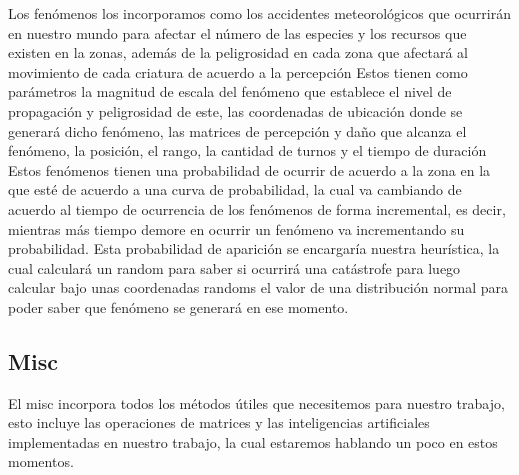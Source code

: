 \documentclass{llncs}
\begin{document}
Los fenómenos los incorporamos como los accidentes meteorológicos que ocurrirán en nuestro mundo para afectar el número de las especies y los recursos que existen en la zonas, además de la peligrosidad en cada zona que afectará al movimiento de cada criatura de acuerdo a la percepción
\newline
\newline
Estos tienen como parámetros la magnitud de escala del fenómeno que establece el nivel de propagación y peligrosidad de este, las coordenadas de ubicación donde se generará dicho fenómeno, las matrices de percepción y daño que alcanza el fenómeno, la posición, el rango, la cantidad de turnos y el tiempo de duración
\newline
\newline
Estos fenómenos tienen una probabilidad de ocurrir de acuerdo a la zona en la que esté de acuerdo a una curva de probabilidad, la cual va cambiando de acuerdo al tiempo de ocurrencia de los fenómenos de forma incremental, es decir, mientras más tiempo demore en ocurrir un fenómeno va incrementando su probabilidad. Esta probabilidad de aparición se encargaría nuestra heurística, la cual calculará un random para saber si ocurrirá una catástrofe para luego calcular bajo unas coordenadas randoms el valor de una distribución normal para poder saber que fenómeno se generará en ese momento.

\subsection{Misc}
El misc incorpora todos los métodos útiles que necesitemos para nuestro trabajo, esto incluye las operaciones de matrices y las inteligencias artificiales implementadas en nuestro trabajo, la cual estaremos hablando un poco en estos momentos.
\end{document}
